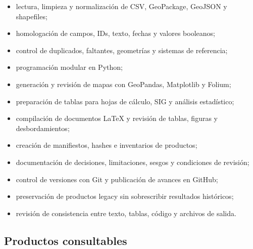 \documentclass[
  spanish,
]{article}
\providecommand{\tightlist}{%
  \setlength{\itemsep}{0pt}\setlength{\parskip}{0pt}}
\begin{document}
\begin{itemize}
\tightlist
\item
  lectura, limpieza y normalización de CSV, GeoPackage, GeoJSON y
  shapefiles;
\item
  homologación de campos, IDs, texto, fechas y valores booleanos;
\item
  control de duplicados, faltantes, geometrías y sistemas de referencia;
\item
  programación modular en Python;
\item
  generación y revisión de mapas con GeoPandas, Matplotlib y Folium;
\item
  preparación de tablas para hojas de cálculo, SIG y análisis
  estadístico;
\item
  compilación de documentos LaTeX y revisión de tablas, figuras y
  desbordamientos;
\item
  creación de manifiestos, hashes e inventarios de productos;
\item
  documentación de decisiones, limitaciones, sesgos y condiciones de
  revisión;
\item
  control de versiones con Git y publicación de avances en GitHub;
\item
  preservación de productos legacy sin sobrescribir resultados
  históricos;
\item
  revisión de consistencia entre texto, tablas, código y archivos de
  salida.
\end{itemize}

\subsection{Productos consultables}\label{productos-consultables}
\end{document}
